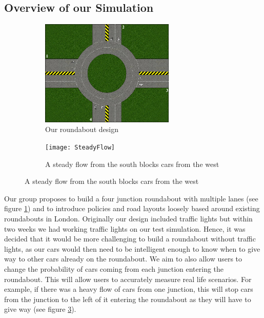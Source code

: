 \documentclass[11pt]{article}
\begin{document}
	\subsection{Overview of our Simulation}
	\begin{figure}
    \centering
    	\begin{subfigure}{.35\textwidth}
        	\centering
			\includegraphics[width=0.7\textwidth]{Roundabout2}
			\caption{Our roundabout design}
			\label{Roundabout Design}
        \end{subfigure}
    	\begin{subfigure}{.35\textwidth}
			\centering
			\texttt{[image: SteadyFlow]}
			\caption{A steady flow from the south blocks cars from the west}
			\label{SteadyFlow}
	\end{subfigure}
	
	\end{figure}
	Our group proposes to build a four junction roundabout with multiple lanes (see figure \ref{Roundabout Design}) and to introduce policies and road layouts loosely based around existing roundabouts in London. Originally our design included traffic lights but within two weeks we had working traffic lights on our test simulation. Hence, it was decided that it would be more challenging to build a roundabout without traffic lights, as our cars would then need to be intelligent enough to know when to give way to other cars already on the roundabout. We aim to also allow users to change the probability of cars coming from each junction entering the roundabout. This will allow users to accurately measure real life scenarios. For example, if there was a heavy flow of cars from one junction, this will stop cars from the junction to the left of it entering the roundabout as they will have to give way (see figure \ref{SteadyFlow}).
	
\end{document}
